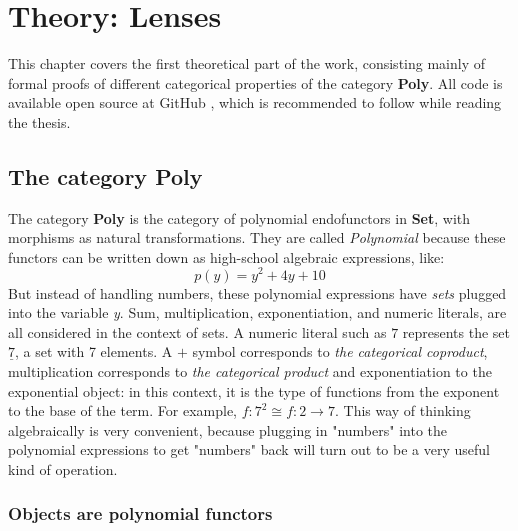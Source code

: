 
\chapter{Theory: Lenses}\label{chapter:lenses}
This chapter covers the first theoretical part of the work, consisting mainly of formal proofs of different categorical properties of the category \textbf{Poly}. All code is available open source at GitHub \cite{code}, which is recommended to follow while reading the thesis.

\section{The category \textbf{Poly}}

The category \textbf{Poly} is the category of polynomial endofunctors in \textbf{Set}, with morphisms as natural transformations. They are called \textit{Polynomial} because these functors can be written down as high-school algebraic expressions, like:
$$p(y) = y^2 +4y + 10$$
But instead of handling numbers, these polynomial expressions have \textit{sets} plugged into the variable \textit{y}.
Sum, multiplication, exponentiation, and numeric literals, are all considered in the context of sets. A numeric literal such as $7$ represents the set $\underline{7}$, a set with 7 elements. A $+$ symbol corresponds to \textit{the categorical coproduct}, multiplication  corresponds to \textit{the categorical product} and exponentiation to the exponential object: in this context, it is the type of functions from the exponent to the base of the term. For example, $ f : 7^2 \cong f : 2 \rightarrow 7$. This way of thinking algebraically is very convenient, because plugging in "numbers" into the polynomial expressions to get "numbers" back will turn out to be a very useful kind of operation.

\subsection{Objects are polynomial functors}

